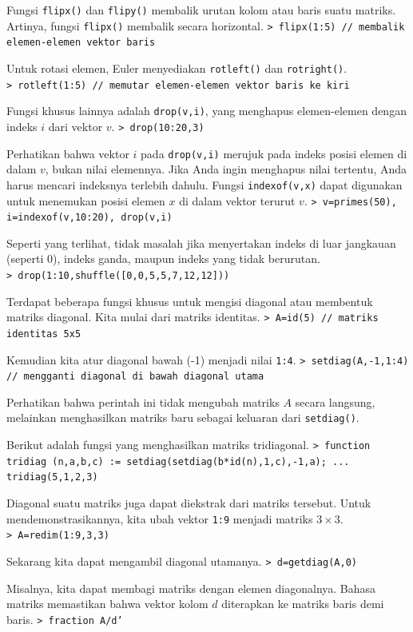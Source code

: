 \documentclass[11pt, a4paper]{article}
\newcommand{\emtcmd}[1]{\noindent\texttt{\textcolor{emtcommand}{>}\ #1}\par\smallskip}
\begin{document}
Fungsi \texttt{flipx()} dan \texttt{flipy()} membalik urutan kolom atau baris suatu matriks. Artinya, fungsi \texttt{flipx()} membalik secara horizontal.
\emtcmd{flipx(1:5) \textcolor{emtcomment}{// membalik elemen-elemen vektor baris}}

Untuk rotasi elemen, Euler menyediakan \texttt{rotleft()} dan \texttt{rotright()}.
\emtcmd{rotleft(1:5) \textcolor{emtcomment}{// memutar elemen-elemen vektor baris ke kiri}}

Fungsi khusus lainnya adalah \texttt{drop(v,i)}, yang menghapus elemen-elemen dengan indeks $i$ dari vektor $v$.
\emtcmd{drop(10:20,3)}

Perhatikan bahwa vektor $i$ pada \texttt{drop(v,i)} merujuk pada indeks posisi elemen di dalam $v$, bukan nilai elemennya. Jika Anda ingin menghapus nilai tertentu, Anda harus mencari indeksnya terlebih dahulu. Fungsi \texttt{indexof(v,x)} dapat digunakan untuk menemukan posisi elemen $x$ di dalam vektor terurut $v$.
\emtcmd{v=primes(50), i=indexof(v,10:20), drop(v,i)}

Seperti yang terlihat, tidak masalah jika menyertakan indeks di luar jangkauan (seperti 0), indeks ganda, maupun indeks yang tidak berurutan.
\emtcmd{drop(1:10,shuffle([0,0,5,5,7,12,12]))}

Terdapat beberapa fungsi khusus untuk mengisi diagonal atau membentuk matriks diagonal. Kita mulai dari matriks identitas.
\emtcmd{A=id(5) \textcolor{emtcomment}{// matriks identitas 5x5}}

Kemudian kita atur diagonal bawah (-1) menjadi nilai \texttt{1:4}.
\emtcmd{setdiag(A,-1,1:4) \textcolor{emtcomment}{// mengganti diagonal di bawah diagonal utama}}

Perhatikan bahwa perintah ini tidak mengubah matriks $A$ secara langsung, melainkan menghasilkan matriks baru sebagai keluaran dari \texttt{setdiag()}.

Berikut adalah fungsi yang menghasilkan matriks tridiagonal.
\emtcmd{function tridiag (n,a,b,c) := setdiag(setdiag(b*id(n),1,c),-1,a); ... \\
\hspace*{1em} tridiag(5,1,2,3)}

Diagonal suatu matriks juga dapat diekstrak dari matriks tersebut. Untuk mendemonstrasikannya, kita ubah vektor \texttt{1:9} menjadi matriks $3 \times 3$.
\emtcmd{A=redim(1:9,3,3)}

Sekarang kita dapat mengambil diagonal utamanya.
\emtcmd{d=getdiag(A,0)}

Misalnya, kita dapat membagi matriks dengan elemen diagonalnya. Bahasa matriks memastikan bahwa vektor kolom $d$ diterapkan ke matriks baris demi baris.
\emtcmd{fraction A/d'}
\end{document}
